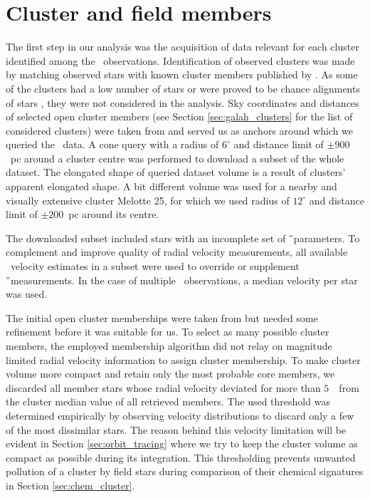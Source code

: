 \section{Cluster and field members}
\label{sec:membership_v2}
The first step in our analysis was the acquisition of data relevant for each cluster identified among the \Gh\ observations. Identification of observed clusters was made by matching observed stars with known cluster members published by \citet{2018A&A...618A..93C}. As some of the clusters had a low number of stars or were proved to be chance alignments of stars \cite{2018MNRAS.480.5242K}, they were not considered in the analysis. Sky coordinates and distances of selected open cluster members (see Section \ref{sec:galah_clusters} for the list of considered clusters) were taken from \citet{2018A&A...618A..93C} and served us as anchors around which we queried the \Gs\ data. A cone query with a radius of $6^\circ$ and distance limit of $\pm900$~pc around a cluster centre was performed to download a subset of the whole dataset. The elongated shape of queried dataset volume is a result of clusters' apparent elongated shape. A bit different volume was used for a nearby and visually extensive cluster Melotte 25, for which we used radius of $12^\circ$ and distance limit of $\pm200$~pc around its centre. 

The downloaded subset included stars with an incomplete set of \G\ parameters. To complement and improve quality of radial velocity measurements, all available \Gh\ velocity estimates in a subset were used to override or supplement \G\ measurements. In the case of multiple \Gh\ observations, a median velocity per star was used. 

The initial open cluster memberships were taken from \citet{2018A&A...618A..93C} but needed some refinement before it was suitable for us. To select as many possible cluster members, the employed membership algorithm did not relay on magnitude limited radial velocity information to assign cluster membership. To make cluster volume more compact and retain only the most probable core members, we discarded all member stars whose radial velocity deviated for more than $5$~\kms\ from the cluster median value of all retrieved members. The used threshold was determined empirically by observing velocity distributions to discard only a few of the most dissimilar stars. The reason behind this velocity limitation will be evident in Section \ref{sec:orbit_tracing} where we try to keep the cluster volume as compact as possible during its integration. This thresholding prevents unwanted pollution of a cluster by field stars during comparison of their chemical signatures in Section \ref{sec:chem_cluster}. 

